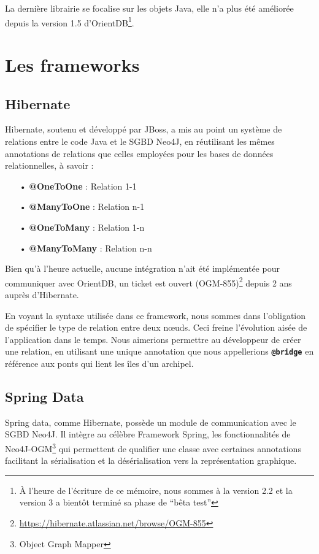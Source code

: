 \documentclass[a4paper,fleqn,12pt,oneside]{report}
\begin{document}
La dernière librairie se focalise sur les objets Java, elle n'a plus été améliorée depuis la version 1.5 d'OrientDB\footnote{À l'heure de l'écriture de ce mémoire, nous sommes à la version 2.2 et la version 3 a bientôt terminé sa phase de \enquote{bêta test}}.

\section{Les frameworks}

\subsection{Hibernate}

Hibernate, soutenu et développé par JBoss, a mis au point un système de relations entre le code Java et le SGBD Neo4J, en réutilisant les mêmes annotations de relations que celles employées pour les bases de données relationnelles, à savoir :

\begin{itemize}
\item[•] \textbf{@OneToOne} : Relation 1-1
\item[•] \textbf{@ManyToOne} : Relation n-1
\item[•] \textbf{@OneToMany} : Relation 1-n
\item[•] \textbf{@ManyToMany} : Relation n-n
\end{itemize}

Bien qu'à l'heure actuelle, aucune intégration n'ait été implémentée pour communiquer avec OrientDB, un ticket est ouvert (OGM-855)\footnote{\url{https://hibernate.atlassian.net/browse/OGM-855}} depuis 2 ans auprès d'Hibernate.

En voyant la syntaxe utilisée dans ce framework, nous sommes dans l'obligation de spécifier le type de relation entre deux nœuds. Ceci freine l'évolution aisée de l'application dans le temps. Nous aimerions permettre au développeur de créer une relation, en utilisant une unique annotation que nous appellerions \textbf{\texttt{@bridge}} en référence aux ponts qui lient les îles d'un archipel. \label{bridge}

\subsection{Spring Data}

Spring data, comme Hibernate, possède un module de communication avec le SGBD Neo4J. Il intègre au célèbre Framework Spring, les fonctionnalités de Neo4J-OGM\footnote{Object Graph Mapper} qui permettent de qualifier une classe avec certaines annotations facilitant la sérialisation et la désérialisation vers la représentation graphique.
\end{document}
